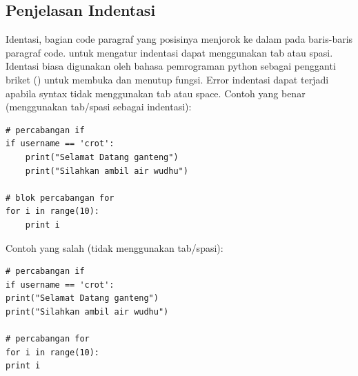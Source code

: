\subsection{Penjelasan Indentasi}
Identasi, bagian code paragraf yang posisinya menjorok ke dalam pada baris-baris paragraf code. untuk mengatur indentasi dapat menggunakan tab atau spasi. Identasi biasa digunakan oleh bahasa pemrograman python sebagai pengganti briket ({}) untuk membuka dan menutup fungsi. Error indentasi dapat terjadi apabila syntax tidak menggunakan tab atau space.
Contoh yang benar (menggunakan tab/spasi sebagai indentasi):
\begin{verbatim}
# percabangan if
if username == 'crot':
    print("Selamat Datang ganteng")
    print("Silahkan ambil air wudhu")

# blok percabangan for
for i in range(10):
    print i
\end{verbatim}
Contoh yang salah (tidak menggunakan tab/spasi):
\begin{verbatim}
# percabangan if
if username == 'crot':
print("Selamat Datang ganteng")
print("Silahkan ambil air wudhu")

# percabangan for
for i in range(10):
print i
\end{verbatim}

